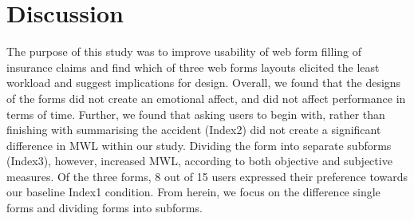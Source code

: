 \documentclass[../main/Replicate.tex]{subfiles}
\begin{document}
\section{Discussion}
	The purpose of this study was to improve usability of web form filling of insurance claims and find which of three web forms layouts elicited the least workload and suggest implications for design. Overall, we found that the designs of the forms did not create an emotional affect, and did not affect performance in terms of time. Further, we found that asking users to begin with, rather than finishing with summarising the accident (Index2) did not create a significant difference in MWL within our study. Dividing the form into separate subforms (Index3), however, increased MWL, according to both objective and subjective measures. Of the three forms, 8 out of 15 users expressed their preference towards our baseline Index1 condition. From herein, we focus on the difference single forms and dividing forms into subforms. \balance
	
\end{document}
